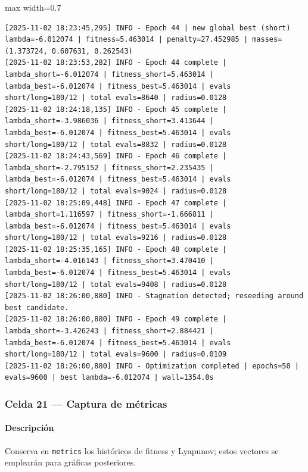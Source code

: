 \begin{listing}[H]
\caption{Ejemplo Salida}
\begin{adjustbox}{max width=0.7\textwidth}
\begin{minipage}{\textwidth}
\begin{verbatim}
[2025-11-02 18:23:45,295] INFO - Epoch 44 | new global best (short) lambda=-6.012074 | fitness=5.463014 | penalty=27.452985 | masses=(1.373724, 0.607631, 0.262543)
[2025-11-02 18:23:53,282] INFO - Epoch 44 complete | lambda_short=-6.012074 | fitness_short=5.463014 | lambda_best=-6.012074 | fitness_best=5.463014 | evals short/long=180/12 | total evals=8640 | radius=0.0128
[2025-11-02 18:24:18,135] INFO - Epoch 45 complete | lambda_short=-3.986036 | fitness_short=3.413644 | lambda_best=-6.012074 | fitness_best=5.463014 | evals short/long=180/12 | total evals=8832 | radius=0.0128
[2025-11-02 18:24:43,569] INFO - Epoch 46 complete | lambda_short=-2.795152 | fitness_short=2.235435 | lambda_best=-6.012074 | fitness_best=5.463014 | evals short/long=180/12 | total evals=9024 | radius=0.0128
[2025-11-02 18:25:09,448] INFO - Epoch 47 complete | lambda_short=1.116597 | fitness_short=-1.666811 | lambda_best=-6.012074 | fitness_best=5.463014 | evals short/long=180/12 | total evals=9216 | radius=0.0128
[2025-11-02 18:25:35,165] INFO - Epoch 48 complete | lambda_short=-4.016143 | fitness_short=3.470410 | lambda_best=-6.012074 | fitness_best=5.463014 | evals short/long=180/12 | total evals=9408 | radius=0.0128
[2025-11-02 18:26:00,880] INFO - Stagnation detected; reseeding around best candidate.
[2025-11-02 18:26:00,880] INFO - Epoch 49 complete | lambda_short=-3.426243 | fitness_short=2.884421 | lambda_best=-6.012074 | fitness_best=5.463014 | evals short/long=180/12 | total evals=9600 | radius=0.0109
[2025-11-02 18:26:00,880] INFO - Optimization completed | epochs=50 | evals=9600 | best lambda=-6.012074 | wall=1354.0s
\end{verbatim}
\end{minipage}
\end{adjustbox}
\end{listing}

\subsubsection*{Celda 21 — Captura de métricas}
\paragraph{Descripción} Conserva en \texttt{metrics} los históricos de fitness y Lyapunov; estos vectores se emplearán para gráficas posteriores.
